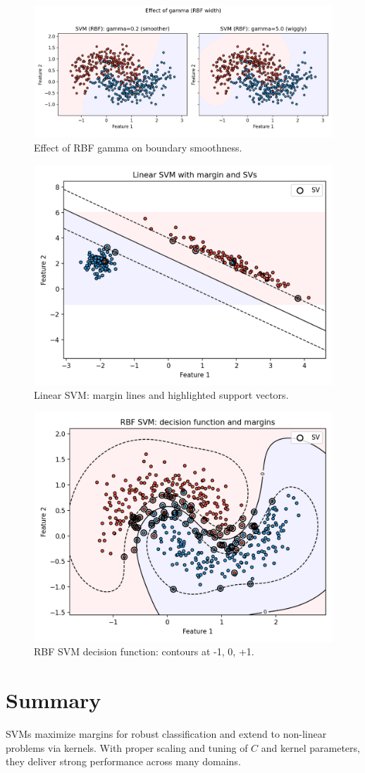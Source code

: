 \documentclass[11pt]{article}
\begin{document}
\begin{figure}[H]
  \centering
  \includegraphics[width=0.95\linewidth]{svm_gamma_compare.png}
  \caption{Effect of RBF gamma on boundary smoothness.}
  \label{fig:svm_gamma}
\end{figure}
\FloatBarrier

\begin{figure}[H]
  \centering
  \includegraphics[width=0.85\linewidth]{svm_margin_support_vectors.png}
  \caption{Linear SVM: margin lines and highlighted support vectors.}
  \label{fig:svm_margin}
\end{figure}
\FloatBarrier

\begin{figure}[H]
  \centering
  \includegraphics[width=0.85\linewidth]{svm_decision_function.png}
  \caption{RBF SVM decision function: contours at -1, 0, +1.}
  \label{fig:svm_df}
\end{figure}
\FloatBarrier

\section{Summary}
SVMs maximize margins for robust classification and extend to non-linear problems via kernels. With proper scaling and tuning of $C$ and kernel parameters, they deliver strong performance across many domains.
\end{document}
